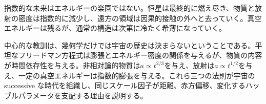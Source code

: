 指数的な未来はエネルギーの楽園ではない。恒星は最終的に燃え尽き、物質と放射の密度は指数的に減少し、遠方の領域は因果的接触の外へと去っていく。真空エネルギーは残るが、通常の構造は次第に冷たく希薄になっていく。

\begin{classroomqa}
\end{classroomqa}

中心的な教訓は、幾何学だけでは宇宙の歴史は決まらないということである。平坦なフリードマン方程式は膨張とエネルギー密度の関係を与えるが、物質の内容が時間依存性を与える。非相対論的物質は\(a\propto t^{2/3}\)を与え、放射は\(a\propto t^{1/2}\)を与え、一定の真空エネルギーは指数的膨張を与える。これら三つの法則が宇宙の successive な時代を組織し、同じスケール因子が距離、赤方偏移、変化するハッブルパラメータを支配する理由を説明する。
